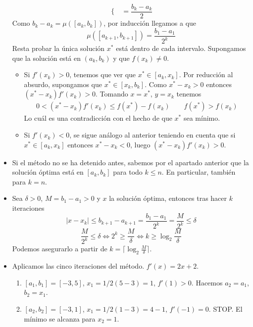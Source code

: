 \documentclass[twoside]{article}
\begin{document}
\begin{solucion}
\begin{itemize}
$$\begin{cases}
\end{cases} = \frac{b_k-a_k}{2}
$$
Como $b_k-a_k = \mu([a_k,b_k])$, por inducción llegamos a que
$$
\mu([a_{k+1},b_{k+1}]) = \frac{b_1-a_1}{2^k}
$$
Resta probar la única solución $x^*$ está dentro de cada intervalo. Supongamos que la solución está en $(a_k,b_k)$ y que $f(x_k)\neq0$.
\begin{itemize}
\item Si $f'(x_k)>0$, tenemos que ver que $x^*\in [a_k,x_k]$. Por reducción al absurdo, supongamos que $x^*\in [x_k,b_k]$. Como $x^*-x_k>0$ entonces $(x^*-x_k)f'(x_k)>0$. Tomando $x=x^*$, $y=x_k$ tenemos
\begin{gather*}0<(x^*-x_k)f'(x_k)\leq {f(x^*)-f(x_k)} \qquad f(x^*) > f(x_k)
\end{gather*}
Lo cuál es una contradicción con el hecho de que $x^*$ sea mínimo.
\item Si $f'(x_k)<0$, se sigue análogo al anterior teniendo en cuenta que si $x^*\in[a_k,x_k]$ entonces $x^*-x_k<0$, luego $(x^*-x_k)f'(x_k)>0$. 
\end{itemize}
\item Si el método no se ha detenido antes, sabemos por el apartado anterior que la solución óptima está en $[a_k,b_k]$ para todo $k\leq n$. En particular, también para $k=n$.
\item Sea $\delta>0$, $M=b_1-a_1>0$ y $x$ la solución óptima, entonces tras hacer $k$ iteraciones  
$$
|x-x_k|\leq b_{k+1}-a_{k+1} = \frac{b_1-a_1}{2^k}=\frac{M}{2^k}\leq\delta
$$
$$\frac{M}{2^k}\leq\delta \Leftrightarrow 2^k \geq \frac{M}{\delta} \Leftrightarrow k \geq \log_2  \frac{M}{\delta}
$$
Podemos asegurarlo a partir de $k=\lceil\log_2  \frac{M}{\delta}\rceil$.
\item Aplicamos las cinco iteraciones del método. $f'(x)=2x+2$.
\begin{enumerate} 
\item $[a_1,b_1]=[-3,5]$, $x_1 = 1/2(5-3)= 1$, $f'(1)>0$. Hacemos $a_2=a_1$, $b_2=x_1$.
\item $[a_2,b_2]=[-3,1]$, $x_1 = 1/2(1-3)= 4-1$, $f'(-1)=0$. STOP. El mínimo se alcanza para $x_2 =1$.
\end{enumerate}
\end{itemize}

\end{solucion}

\newpage
\end{document}
